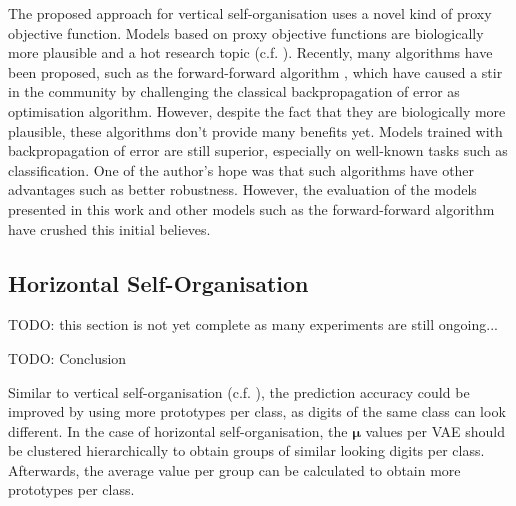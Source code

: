 The proposed approach for vertical self-organisation uses a novel kind of proxy objective function. Models based on proxy objective functions are biologically more plausible and a hot research topic (c.f. ). Recently, many algorithms have been proposed, such as the forward-forward algorithm , which have caused a stir in the community by challenging the classical backpropagation of error as optimisation algorithm. However, despite the fact that they are biologically more plausible, these algorithms don't provide many benefits yet. Models trained with backpropagation of error are still superior, especially on well-known tasks such as classification. One of the author's hope was that such algorithms have other advantages such as better robustness. However, the evaluation of the models presented in this work and other models such as the forward-forward algorithm have crushed this initial believes.


\subsection{Horizontal Self-Organisation}
TODO: this section is not yet complete as many experiments are still ongoing...


TODO: Conclusion


Similar to vertical self-organisation (c.f. ), the prediction accuracy could be improved by using more prototypes per class, as digits of the same class can look different. In the case of horizontal self-organisation, the $\boldsymbol{\mu}$ values per VAE should be clustered hierarchically to obtain groups of similar looking digits per class. Afterwards, the average value per group can be calculated to obtain more prototypes per class.

